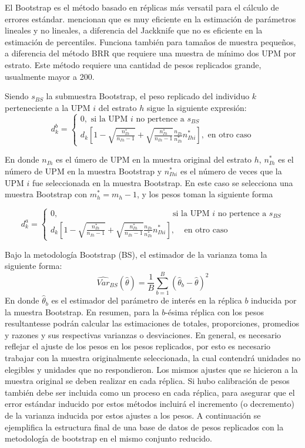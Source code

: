\documentclass[
  12pt,
]{book}
\begin{document}
El Bootstrap es el método basado en réplicas más versatil para el cálculo de errores estándar. \citet{Valliant_Dever_2017} mencionan que es muy eficiente en la estimación de parámetros lineales y no lineales, a diferencia del Jackknife que no es eficiente en la estimación de percentiles. Funciona también para tamaños de muestra pequeños, a diferencia del método BRR que requiere una muestra de mínimo dos UPM por estrato. Este método requiere una cantidad de pesos replicados grande, usualmente mayor a 200.

Siendo \(s_{BS}\) la submuestra Bootstrap, el peso replicado del individuo \(k\) perteneciente a la UPM \(i\) del estrato \(h\) sigue la siguiente expresión:
\[
d_k^b = 
\begin{cases}
0, \text{\ si la UPM $i$ no pertence a $s_{BS}$} \\
d_k\left[1 - \sqrt{\frac{n_{Ih}^*}{n_{Ih}-1}}+\sqrt{\frac{n_{Ih}^*}{n_{Ih}-1}}
\frac{n_{Ih}}{n_{Ih}^*}n_{Ihi}^*
\right], \text{\ en otro caso} 
\end{cases}
\]

En donde \(n_{Ih}\) es el úmero de UPM en la muestra original del estrato \(h\), \(n_{Ih}^*\) es el número de UPM en la muestra Bootstrap y \(n_{Ihi}^*\) es el número de veces que la UPM \(i\) fue seleccionada en la muestra Bootstrap. En este caso se selecciona una muestra Bootstrap con \(m^*_h = m_h - 1\), y los pesos toman la siguiente forma

\[
d_k^a = 
\begin{cases}
0,  \ \ \  \ \ \ \ \ \  \ \ \  \ \ \  \ \ \  \ \ \  \ \ \  \ \ \  \ \ \  \ \ \  \ \ \  \ \ \  \ \ \  \ \ \  \ \ \ \ \ \  \ \ \  \ \ \  \ \ \  \ \ \ \text{si la UPM $i$ no pertence a $s_{BS}$} \\
d_k\left[1 - \sqrt{\frac{n_{Ih}^*}{n_{Ih}-1}}+\sqrt{\frac{n_{Ih}^*}{n_{Ih}-1}}
\frac{n_{Ih}}{n_{Ih}^*}n_{Ihi}^*
\right],  \ \ \  \ \ \text{en otro caso} 
\end{cases}
\]

Bajo la metodología Bootstrap (BS), el estimador de la varianza toma la siguiente forma:
\[
\widehat{Var}_{BS}(\hat{\theta}) = \frac{1}{B}\sum_{b=1}^B(\hat{\theta}_b - \hat\theta )^2
\]
En donde \(\hat{\theta}_b\) es el estimador del parámetro de interés en la réplica \(b\) inducida por la muestra Bootstrap. En resumen, para la \(b\)-ésima réplica con los pesos resultantesse podrán calcular las estimaciones de totales, proporciones, promedios y razones y sus respectivas varianzas o desviaciones. En general, es necesario reflejar el ajuste de los pesos en los pesos replicados, por esto es necesario trabajar con la muestra originalmente seleccionada, la cual contendrá unidades no elegibles y unidades que no respondieron. Los mismos ajustes que se hicieron a la muestra original se deben realizar en cada réplica. Si hubo calibración de pesos también debe ser incluida como un proceso en cada réplica, para asegurar que el error estándar inducido por estos métodos incluirá el incremento (o decremento) de la varianza inducida por estos ajustes a los pesos. A continuación se ejemplifica la estructura final de una base de datos de pesos replicados con la metodología de bootstrap en el mismo conjunto reducido.
\end{document}
